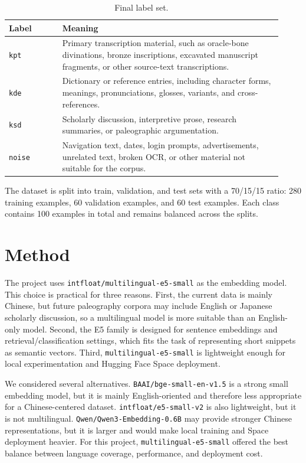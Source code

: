 \documentclass[11pt,a4paper]{article}
\begin{document}
\begin{table}[h]
\centering
\small
\begin{tabular}{p{0.18\linewidth}p{0.74\linewidth}}
\toprule
\textbf{Label} & \textbf{Meaning} \\
\midrule
\texttt{kpt} & Primary transcription material, such as oracle-bone divinations, bronze inscriptions, excavated manuscript fragments, or other source-text transcriptions. \\
\texttt{kde} & Dictionary or reference entries, including character forms, meanings, pronunciations, glosses, variants, and cross-references. \\
\texttt{ksd} & Scholarly discussion, interpretive prose, research summaries, or paleographic argumentation. \\
\texttt{noise} & Navigation text, dates, login prompts, advertisements, unrelated text, broken OCR, or other material not suitable for the corpus. \\
\bottomrule
\end{tabular}
\caption{Final label set.}
\label{tab:labels}
\end{table}

The dataset is split into train, validation, and test sets with a 70/15/15 ratio: 280 training examples, 60 validation examples, and 60 test examples. Each class contains 100 examples in total and remains balanced across the splits.

\section{Method}

The project uses \texttt{intfloat/multilingual-e5-small} as the embedding model. This choice is practical for three reasons. First, the current data is mainly Chinese, but future paleography corpora may include English or Japanese scholarly discussion, so a multilingual model is more suitable than an English-only model. Second, the E5 family is designed for sentence embeddings and retrieval/classification settings, which fits the task of representing short snippets as semantic vectors. Third, \texttt{multilingual-e5-small} is lightweight enough for local experimentation and Hugging Face Space deployment.

We considered several alternatives. \texttt{BAAI/bge-small-en-v1.5} is a strong small embedding model, but it is mainly English-oriented and therefore less appropriate for a Chinese-centered dataset. \texttt{intfloat/e5-small-v2} is also lightweight, but it is not multilingual. \texttt{Qwen/Qwen3-Embedding-0.6B} may provide stronger Chinese representations, but it is larger and would make local training and Space deployment heavier. For this project, \texttt{multilingual-e5-small} offered the best balance between language coverage, performance, and deployment cost.
\end{document}
